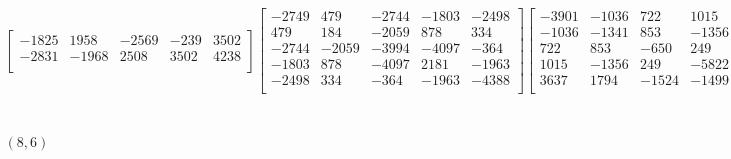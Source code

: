 \documentclass[12pt]{amsart}
\theoremstyle{plain}
\theoremstyle{definition}
\begin{document}
\begin{landscape}
\begin{align*}
\begin{bmatrix}
 -1825  &   1958  &   -2569  &   -239  &   3502  \\ 
 -2831  &   -1968  &   2508  &   3502  &   4238  \\ 
\end{bmatrix}
\begin{bmatrix}
-2749  &   479  &   -2744  &   -1803  &   -2498  \\ 
 479  &   184  &   -2059  &   878  &   334  \\ 
 -2744  &   -2059  &   -3994  &   -4097  &   -364  \\ 
 -1803  &   878  &   -4097  &   2181  &   -1963  \\ 
 -2498  &   334  &   -364  &   -1963  &   -4388  \\ 
\end{bmatrix}
\begin{bmatrix}
-3901  &   -1036  &   722  &   1015  &   3637  \\ 
 -1036  &   -1341  &   853  &   -1356  &   1794  \\ 
 722  &   853  &   -650  &   249  &   -1524  \\ 
 1015  &   -1356  &   249  &   -5822  &   -1499  \\ 
 3637  &   1794  &   -1524  &   -1499  &   -5105  \\ 
\end{bmatrix}
\\
(8,6) &:
\begin{bmatrix}
1112  &   -4233  &   7  &   1091  &   736  \\ 
 -4233  &   -3813  &   -1522  &   2847  &   576  \\ 
 7  &   -1522  &   2395  &   -2275  &   -109  \\ 
 1091  &   2847  &   -2275  &   6570  &   -188  \\ 
 736  &   576  &   -109  &   -188  &   -176  \\ 
\end{bmatrix}
\begin{bmatrix}
-5926  &   -4140  &   896  &   -2563  &   -101  \\ 
 -4140  &   -1714  &   -3920  &   409  &   -48  \\ 
 896  &   -3920  &   1496  &   -716  &   -178  \\ 
 -2563  &   409  &   -716  &   6679  &   -711  \\ 
 -101  &   -48  &   -178  &   -711  &   168  \\ 
\end{bmatrix}
\begin{bmatrix}

\end{bmatrix}
\end{align*}
\end{landscape}
\end{document}
